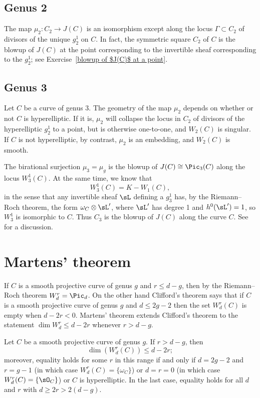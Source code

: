 \subsection*{Genus 2}

The map $\mu_2 : C_{2} \to J(C)$ is an isomorphism except along the
locus $\Gamma \subset  C_{2} $ of divisors of the unique $g^1_2$ on
$C$. In fact, the symmetric square $ C_{2} $ of $C$ is the
%
blowup of $J(C)$%
at the point corresponding to the invertible sheaf
corresponding to the
$g^1_2$; see Exercise~\ref{blowup of $J(C)$ at a point}.


\subsection*{Genus 3}
Let $C$ be a curve of genus 3. The geometry of the map $\mu_2$
depends on whether or not $C$ is hyperelliptic. If it is, $\mu_2$
will collapse the locus in $C_2$ of divisors of the hyperelliptic
$g^1_2$ to a point, but is otherwise one-to-one, and $W_2(C)$ is
singular.  If $C$ is not hyperelliptic, by contrast, $\mu_2$ is an
embedding, and $W_2(C)$ is smooth.

\meshing
The birational surjection $\mu_3 = \mu_g$ is the blowup of
$J(C) \cong \Pic_3(C)$ along the locus $W^1_3(C)$. At the same time, we know
that
$$
W^1_3(C) = K - W_1(C),
$$
in the sense that any invertible sheaf $\sL$ defining a $g^1_3$ has, by the
%
Riemann--Roch theorem,
the form $\omega_C\otimes \sL'$,
where $\sL'$ has degree 1 and $h^0(\sL') = 1$,
so $W^1_3$ is isomorphic to $C$. Thus $C_{3}$ is the blowup of $J(C)$ along the curve $C$.
See \cite[pp.~53--54]{MumfordCJ} for a discussion.

\section{Martens' theorem}

If $C$ is a smooth projective curve of genus $g$ and $r\leq d-g$, then
by the
Riemann--Roch theorem
%
 $W^{r}_{d} = \Pic_{d}$. On the other hand
Clifford's theorem
%
says that if $C$ is a smooth projective curve of genus $g$ and $d\leq 2g-2$
  then the set
 $W^r_d(C)$ is empty when $d-2r<0$. Martens' theorem extends Clifford's theorem to the statement
 $\dim W^r_{d} \leq d-2r$ whenever $r>d-g$.
\label{Martens' theorem}%

\begin{npt}
\begin{theorem}\label{Martens' inequality}
Let $C$ be a smooth projective curve of genus $g$. If $r > d-g$, then
$$
\dim(W^r_d(C)) \leq d-2r;
$$
moreover, equality holds for some $r$ in this range if and only if $d=2g-2$ and $r= g-1$ (in which case $W^r_d(C) = \{\omega_C\}$) or
$d=r=0$ (in which case $W^r_d(C) = \{\sO_C\}$) or $C$ is
hyperelliptic.
%
In the last case, equality holds for all $d$ and $r$ with $d\geq 2r > 2(d-g)$.
\unif
\end{theorem}
\end{npt}

